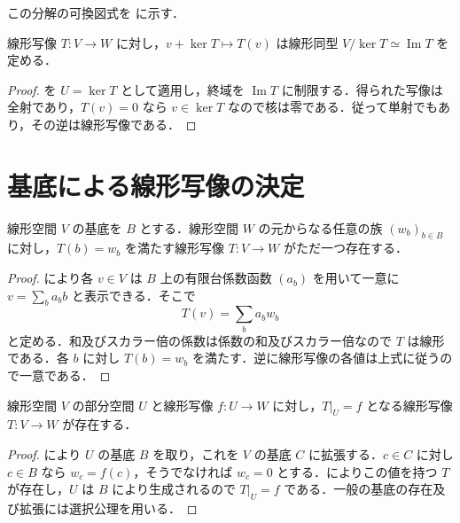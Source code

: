 この分解の可換図式を  に示す．
\begin{prop}[線形写像の第一同型定理]
線形写像 $T:V\to W$ に対し，$v+\ker T\mapsto T(v)$ は線形同型 $V/\ker T\simeq\operatorname{Im}T$ を定める．
\end{prop}
\begin{proof}
を $U=\ker T$ として適用し，終域を $\operatorname{Im}T$ に制限する．得られた写像は全射であり，$T(v)=0$ なら $v\in\ker T$ なので核は零である．従って単射でもあり，その逆は線形写像である．
\end{proof}
\section{基底による線形写像の決定}
\begin{prop}[基底上の指定による線形写像]
線形空間 $V$ の基底を $B$ とする．線形空間 $W$ の元からなる任意の族 $(w_b)_{b\in B}$ に対し，$T(b)=w_b$ を満たす線形写像 $T:V\to W$ がただ一つ存在する．
\end{prop}
\begin{proof}
により各 $v\in V$ は $B$ 上の有限台係数函数 $(a_b)$ を用いて一意に $v=\sum_b a_bb$ と表示できる．そこで
\[
 T(v)=\sum_b a_bw_b
\]
と定める．和及びスカラー倍の係数は係数の和及びスカラー倍なので $T$ は線形である．各 $b$ に対し $T(b)=w_b$ を満たす．逆に線形写像の各値は上式に従うので一意である．
\end{proof}
\begin{prop}[部分空間上の線形写像の延長]
線形空間 $V$ の部分空間 $U$ と線形写像 $f:U\to W$ に対し，$T|_U=f$ となる線形写像 $T:V\to W$ が存在する．
\end{prop}
\begin{proof}
により $U$ の基底 $B$ を取り，これを $V$ の基底 $C$ に拡張する．$c\in C$ に対し $c\in B$ なら $w_c=f(c)$，そうでなければ $w_c=0$ とする．によりこの値を持つ $T$ が存在し，$U$ は $B$ により生成されるので $T|_U=f$ である．一般の基底の存在及び拡張には選択公理を用いる．
\end{proof}

